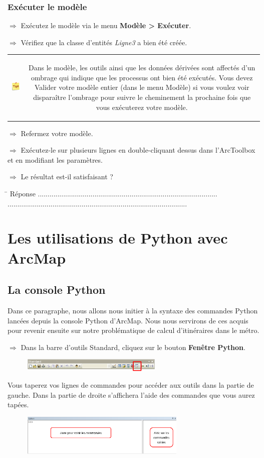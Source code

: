 \documentclass[11pt]{article}
\newcommand{\action}{$\Rightarrow$ }
\newcommand{\reponse}{
	\begin{tabbing}
	\hspace{2cm}\=\kill
	Réponse \> ............................................................................................ \\ 
 	\> ............................................................................................
	\end{tabbing}
}
\newenvironment{note}{%
	\begin{tabular}[t t]{c c}
		\includegraphics{img/tips.png}
		 &
		\begin{minipage}[c]{0.9\linewidth}
			\begin{sffamily}
}{%
			\end{sffamily}
		\end{minipage}
	\end{tabular}	
}
\begin{document}
\subsubsection{Exécuter le modèle}
\action Exécutez le modèle via le menu \textbf{Modèle > Exécuter}.

\action Vérifiez que la classe d'entités \textit{Ligne3} a bien été créée.

\begin{note}
Dans le modèle, les outils ainsi que les données dérivées sont affectés d'un ombrage qui indique que les processus ont bien été exécutés. Vous devez Valider votre modèle entier (dans le menu Modèle) si vous voulez voir disparaître l'ombrage pour suivre le cheminement la prochaine fois que vous exécuterez votre modèle.
\end{note}

\action Refermez votre modèle.

\action Exécutez-le sur plusieurs lignes en double-cliquant dessus dans l'ArcToolbox et en modifiant les paramètres.

\action Le résultat est-il satisfaisant ?

\reponse



\section{Les utilisations de Python avec ArcMap}

\subsection{La console Python}
Dans ce paragraphe, nous allons nous initier à la syntaxe des commandes Python lancées depuis la console Python d'ArcMap. Nous nous servirons de ces acquis pour revenir ensuite sur notre problématique de calcul d'itinéraires dans le métro.

\action Dans la barre d'outils Standard, cliquez sur le bouton \textbf{Fenêtre Python}.
\begin{figure}[H]
	\center \includegraphics[width=0.6\textwidth]{img/td3/python_bouton.png}\\
\end{figure}

Vous taperez vos lignes de commandes pour accéder aux outils dans la partie de gauche. Dans la partie de droite s'affichera l'aide des commandes que vous aurez tapées.	
\begin{figure}[H]
	\center \includegraphics[width=0.7\textwidth]{img/td3/python_console.png}\\
\end{figure}
\end{document}
